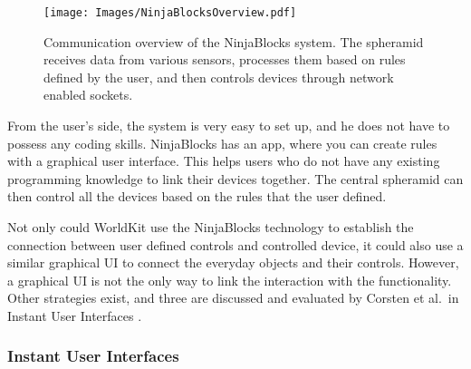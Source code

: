 \begin{figure}[!t]
	\centering
	\texttt{[image: Images/NinjaBlocksOverview.pdf]}
	\caption{Communication overview of the NinjaBlocks system. The spheramid receives data from various sensors, processes them based on rules defined by the user, and then controls devices through network enabled sockets.}
	\label{fig:NinjaBlocksOverview}
\end{figure}

From the user's side, the system is very easy to set up, and he does not have to possess any coding skills.
NinjaBlocks has an app, where you can create rules with a graphical user interface.
This helps users who do not have any existing programming knowledge to link their devices together.
The central spheramid can then control all the devices based on the rules that the user defined.

Not only could WorldKit use the NinjaBlocks technology to establish the connection between user defined controls and controlled device, it could also use a similar graphical UI to connect the everyday objects and their controls.
However, a graphical UI is not the only way to link the interaction with the functionality.
Other strategies exist, and three are discussed and evaluated by Corsten et al.\ in Instant User Interfaces \cite{corsten13}. 

\subsubsection{Instant User Interfaces}
\label{sec:worldKit}

